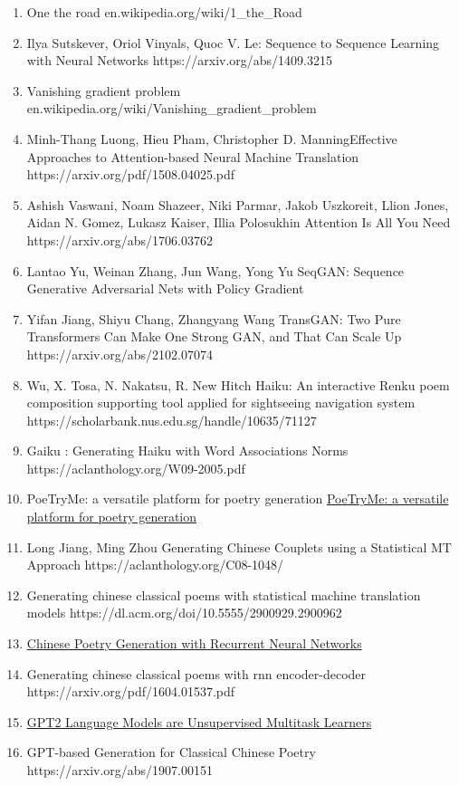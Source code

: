 \documentclass[a4paper]{article}
\theoremstyle{definition}
\begin{document}
\begin{enumerate}[ 1.]
\item One the road en.wikipedia.org/wiki/1\_the\_Road
\item Ilya Sutskever, Oriol Vinyals, Quoc V. Le: Sequence to Sequence Learning with Neural Networks https://arxiv.org/abs/1409.3215
\item Vanishing gradient problem en.wikipedia.org/wiki/Vanishing\_gradient\_problem
\item Minh-Thang Luong, Hieu Pham, Christopher D. ManningEffective Approaches to Attention-based Neural Machine Translation https://arxiv.org/pdf/1508.04025.pdf
\item Ashish Vaswani, Noam Shazeer, Niki Parmar, Jakob Uszkoreit, Llion Jones, Aidan N. Gomez, Lukasz Kaiser, Illia Polosukhin Attention Is All You Need https://arxiv.org/abs/1706.03762
\item Lantao Yu, Weinan Zhang, Jun Wang, Yong Yu SeqGAN: Sequence Generative Adversarial Nets with Policy Gradient
\item Yifan Jiang, Shiyu Chang, Zhangyang Wang TransGAN: Two Pure Transformers Can Make One Strong GAN, and That Can Scale Up https://arxiv.org/abs/2102.07074

\item 	Wu, X. Tosa, N. Nakatsu, R. New Hitch Haiku: An interactive Renku poem composition supporting tool applied for sightseeing navigation system https://scholarbank.nus.edu.sg/handle/10635/71127
\item Gaiku : Generating Haiku with Word Associations Norms https://aclanthology.org/W09-2005.pdf
\item PoeTryMe: a versatile platform for poetry generation  \href{https://www.researchgate.net/publication/236445297_PoeTryMe_a_versatile_platform_for_poetry_generation}{ PoeTryMe: a versatile platform for poetry generation }
\item Long Jiang, Ming Zhou Generating Chinese Couplets using a Statistical MT Approach https://aclanthology.org/C08-1048/
\item Generating chinese classical poems with statistical machine translation models https://dl.acm.org/doi/10.5555/2900929.2900962
\item  \href{https://www.semanticscholar.org/paper/Chinese-Poetry-Generation-with-Recurrent-Neural-Zhang-Lapata/229ec55602143271867682d181ec35f2e43e06e8}{Chinese Poetry Generation with Recurrent Neural Networks}
\item Generating chinese classical poems with rnn encoder-decoder https://arxiv.org/pdf/1604.01537.pdf
\item \href{https://d4mucfpksywv.cloudfront.net/better-language-models/language_models_are_unsupervised_multitask_learners.pdf}{GPT2 Language Models are Unsupervised Multitask Learners}
\item  GPT-based Generation for Classical Chinese Poetry https://arxiv.org/abs/1907.00151


\end{enumerate}
\end{document}

